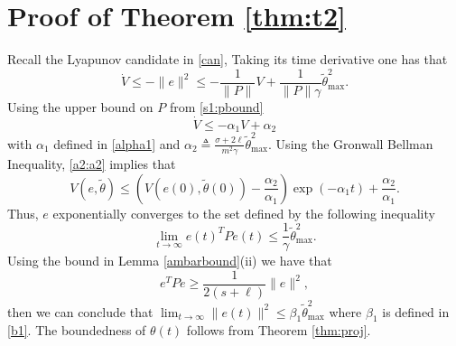 \documentclass[10pt,journal]{IEEEtran}
\theoremstyle{plain}%
\theoremstyle{definition}
\newcommand{\be}[0]{\begin{equation}}
\newcommand{\ee}[0]{\end{equation}}
\newcommand{\ben}[0]{\begin{equation*}}
\newcommand{\een}[0]{\end{equation*}}
\newcommand{\norms}[1]{\lVert#1\rVert}
\newcommand{\normB}[0]{\norms}
\let\norm=\normB
\begin{document}
\section{Proof of Theorem \ref{thm:t2}} \label{pf:thm2}
\begin{IEEEproof} Recall the Lyapunov candidate in \eqref{can}, Taking its time derivative one has that
\ben\label{s2:a1}
\dot V \leq  - \norm{e}^2 
 \leq -\frac{1}{\norm P} V + \frac {1} {\norm P \gamma}  \tilde\theta_\text{max}^2.  
\een
Using the upper bound on $P$ from \eqref{s1:pbound} 
\be
\label{a2:a2} 
\dot V \leq  - \alpha_1 V + \alpha_2
\ee
with $\alpha_1$ defined in \eqref{alpha1} and $\alpha_2  \triangleq\frac {\sigma+2\ell} {m^2 \gamma}  \tilde\theta_\text{max}^2$. Using the Gronwall Bellman Inequality, \eqref{a2:a2} implies that 
\be\label{forapp}
V(e,\tilde\theta)\leq \left( V(e(0),\tilde\theta(0))-\frac{\alpha_2}{\alpha_1}\right)\exp(-\alpha_1 t) + \frac{\alpha_2}{\alpha_1}. 
\ee
Thus, $e$ exponentially converges to the set defined by the following inequality
\ben{\lim_{t\rightarrow\infty} {e(t)^TPe(t)} \leq \frac{1} {\gamma} \tilde\theta_\text{max}^2}.\een
Using the bound in Lemma \ref{ambarbound}(ii) we have that 
\be\label{ePe} e^TPe\geq \frac 1 {2(s+\ell) }\norm e^2,\ee 
then we can conclude that
$\lim_{t\rightarrow\infty}\norm {e(t)}^2 \leq \beta_1 \tilde\theta_\text{max}^2 $
where $\beta_1$ is defined in \eqref{b1}. The boundedness of $\theta(t)$ follows from Theorem \ref{thm:proj}.\end{IEEEproof}
\end{document}
